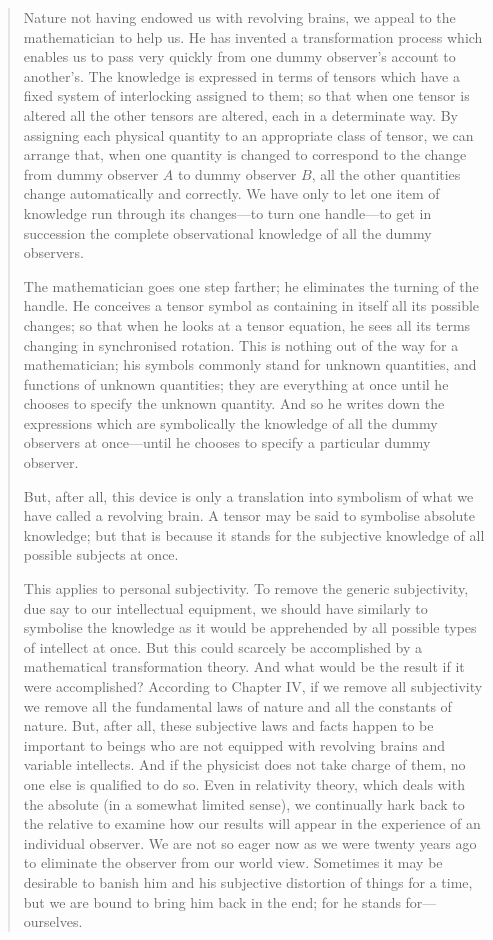 \begin{quote}
    Nature not having endowed us with revolving brains, we appeal to the mathematician to help us.  He has invented a transformation process which enables us to pass very quickly from one dummy observer's account to another's.  The knowledge is expressed in terms of tensors which have a fixed system of interlocking assigned to them; so that when one tensor is altered all the other tensors are altered, each in a determinate way.  By assigning each physical quantity to an appropriate class of tensor, we can arrange that, when one quantity is changed to correspond to the change from dummy observer $A$ to dummy observer $B$, all the other quantities change automatically and correctly.  We have only to let one item of knowledge run through its changes---to turn one handle---to get in succession the complete observational knowledge of all the dummy observers.

    The mathematician goes one step farther; he eliminates the turning of the handle.  He conceives a tensor symbol as containing in itself all its possible changes; so that when he looks at a tensor equation, he sees all its terms changing in synchronised rotation.  This is nothing out of the way for a mathematician; his symbols commonly stand for unknown quantities, and functions of unknown quantities; they are everything at once until he chooses to specify the unknown quantity.  And so he writes down the expressions which are symbolically the knowledge of all the dummy observers at once---until he chooses to specify a particular dummy observer.

    But, after all, this device is only a translation into symbolism of what we have called a revolving brain.  A tensor may be said to symbolise absolute knowledge; but that is because it stands for the subjective knowledge of all possible subjects at once.  

    This applies to personal subjectivity.  To remove the generic subjectivity, due say to our intellectual equipment, we should have similarly to symbolise the knowledge as it would be apprehended by all possible types of intellect at once.  But this could scarcely be accomplished by a mathematical transformation theory.  And what would be the result if it were accomplished?  According to Chapter IV, if we remove all subjectivity we remove all the fundamental laws of nature and all the constants of nature.  But, after all, these subjective laws and facts happen to be important to beings who are not equipped with revolving brains and variable intellects.  And if the physicist does not take charge of them, no one else is qualified to do so.  Even in relativity theory, which deals with the absolute (in a somewhat limited sense), we continually hark back to the relative to examine how our results will appear in the experience of an individual observer.  We are not so eager now as we were twenty years ago to eliminate the observer from our world view.  Sometimes it may be desirable to banish him and his subjective distortion of things for a time, but we are bound to bring him back in the end; for he stands for---ourselves. \citep[p. 85-88]{Eddington1939}
\end{quote}

